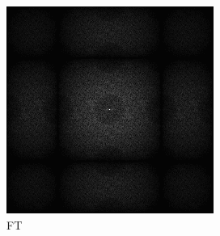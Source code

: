\begin{figure}[H]
\begin{tcolorbox}[boxrule=4pt,sharp corners=downhill,title=Szene unter Kamerabewegung, fonttitle=\bfseries]
\begin{tcolorbox}[boxrule=4pt,sharp corners=downhill,title=Projektion,colbacktitle=green!50!white, coltitle=black]
\begin{subfigure}[b]{0.2\linewidth}
        \includegraphics[width=\linewidth]{content/TemporalerAlg/Bilder/Reprojection/TemporalRepr/Ausschnitte/Ausschnitt4_FFT.png}
        \caption{FT}
        \label{pic:TemporalRepr_4_FFT}
    \end{subfigure}
    \begin{subfigure}[b]{0.2\linewidth}

\end{subfigure}
\end{tcolorbox}
\end{tcolorbox}
\end{figure}
